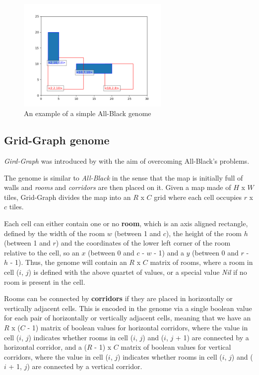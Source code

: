 \begin{figure}[hbt!]
    \centering
    \includegraphics[width=0.65\textwidth]{images/ABGenome.png}
    \caption[All-Black example]{An example of a simple All-Black genome}
    \label{fig:all_black}
\end{figure}

\subsection{Grid-Graph genome}
\label{subsec:grid_graph}
\textit{Gird-Graph} was introduced by \citeauthor{bari_evolutionary-based_2023} with the aim of overcoming All-Black's problems.

The genome is similar to \textit{All-Black} in the sense that the map is initially full of walls and \textit{rooms} and \textit{corridors} are then placed on it. Given a map made of $H$ x $W$ tiles, Grid-Graph divides the map into an $R$ x $C$ grid where each cell occupies $r$ x $c$ tiles. 

Each cell can either contain one or no \textbf{room}, which is an axis aligned rectangle, defined by the width of the room $w$ (between 1 and $c$), the height of the room $h$ (between 1 and $r$) and the coordinates of the lower left corner of the room relative to the cell, so an $x$ (between 0 and $c$ - $w$ - 1) and a $y$ (between 0 and $r$ - $h$ - 1). Thus, the genome will contain an $R$ x $C$ matrix of rooms, where a room in cell ($i$, $j$) is defined with the above quartet of values, or a special value \textit{Nil} if no room is present in the cell.

Rooms can be connected by \textbf{corridors} if they are placed in horizontally or vertically adjacent cells. This is encoded in the genome via a single boolean value for each pair of horizontally or vertically adjacent cells, meaning that we have an $R$ x ($C$ - 1) matrix of boolean values for horizontal corridors, where the value in cell ($i$, $j$) indicates whether rooms in cell ($i$, $j$) and ($i$, $j$ + 1) are connected by a horizontal corridor, and a ($R$ - 1) x $C$ matrix of boolean values for vertical corridors, where the value in cell ($i$, $j$) indicates whether rooms in cell ($i$, $j$) and ($i$ + 1, $j$) are connected by a vertical corridor.

